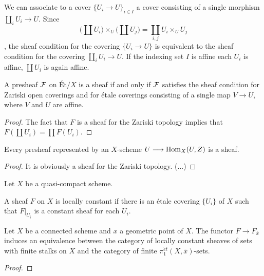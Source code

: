 \begin{remark}
 We can associate to a cover $\{U_i \to U\}_{i \in I}$ a cover consisting of a single morphism $\coprod_i U_i \to U$. Since
  \[
    \bigl(\coprod U_i \bigr) \times_U \bigl( \coprod U_j \bigr) = \coprod_{i,j} U_i \times_U U_j
  \], the sheaf condition for the covering $\{U_i \to U\}$ is equivalent to the sheaf condition for the covering $\coprod_i U_i \to U$. If the indexing set $I$ is affine each $U_i$ is affine, $\coprod U_i$ is again affine.
\end{remark}

\begin{theorem}
  A presheaf $\mathcal{F}$ on $\text{\'Et}/X$ is a sheaf if and only if $\mathcal{F}$ satisfies the sheaf condition for Zariski open coverings and for \'etale coverings consisting of a single map $V \to U$, where $V$ and $U$ are affine.
\end{theorem}

\begin{proof}
  The fact that $F$ is a sheaf for the Zariski topology implies that $F(\coprod U_i) = \prod F(U_i)$.

\end{proof}
\begin{corollary}
  Every presheaf represented by an $X$-scheme $U \longrightarrow \operatorname{Hom}_X(U,Z)$ is a sheaf. 
\end{corollary}
\begin{proof}
  It is obviously a sheaf for the Zariski topology. (...)
\end{proof}

\begin{definition}
  Let $X$ be a quasi-compact scheme. 
\end{definition}

\begin{definition}
  A sheaf $F$ on $X$ is locally constant if there is an \'etale covering $\{U_i\}$ of $X$ such that $F|_{U_i}$ is a constant sheaf for each $U_i$.
\end{definition}

\begin{proposition}
  Let $X$ be a connected scheme and $x$ a geometric point of $X$. The functor $F \to F_{\overline{x}}$ induces an equivalence between the category of locally constant sheaves of sets with finite stalks on $X$ and the category of finite $\pi_1^{\acute{e}t}(X,\overline{x})$-sets.
\end{proposition}
\begin{proof}
  
\end{proof}

